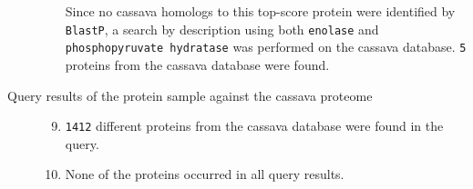 \documentclass[oneside, a4paper, final]{memoir} %
\begin{document}
\begin{description}
\begin{enumerate}
				Since no cassava homologs to this top-score protein were identif{}ied by \texttt{BlastP}, a search by description using both \texttt{enolase} and 
				\texttt{phosphopyruvate hydratase} was performed on the cassava database. \texttt{5} proteins from the cassava database were found.
			\end{enumerate}
		\item[Query results of the protein sample against the cassava proteome]\hfill
			\begin{enumerate}
				\setcounter{enumi}{8}
				\item \texttt{1412} dif{}ferent proteins from the cassava database were found in the query.
				\item None of the proteins occurred in all query results.
			\end{enumerate}			
	\end{description}
\end{document}
